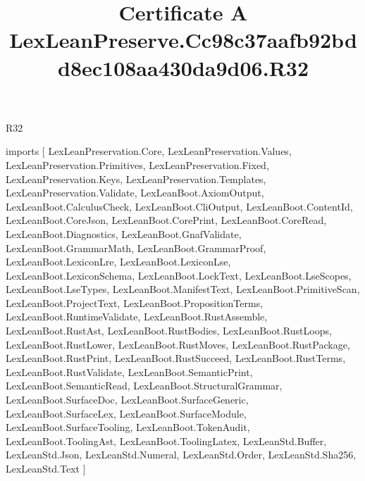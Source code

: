 \begin{lexlean}{R32}
\title{Certificate A LexLeanPreserve.Cc98c37aafb92bdd8ec108aa430da9d06.R32}
\begin{coremodule}
imports [
  LexLeanPreservation.Core,
  LexLeanPreservation.Values,
  LexLeanPreservation.Primitives,
  LexLeanPreservation.Fixed,
  LexLeanPreservation.Keys,
  LexLeanPreservation.Templates,
  LexLeanPreservation.Validate,
  LexLeanBoot.AxiomOutput,
  LexLeanBoot.CalculusCheck,
  LexLeanBoot.CliOutput,
  LexLeanBoot.ContentId,
  LexLeanBoot.CoreJson,
  LexLeanBoot.CorePrint,
  LexLeanBoot.CoreRead,
  LexLeanBoot.Diagnostics,
  LexLeanBoot.GnafValidate,
  LexLeanBoot.GrammarMath,
  LexLeanBoot.GrammarProof,
  LexLeanBoot.LexiconLre,
  LexLeanBoot.LexiconLse,
  LexLeanBoot.LexiconSchema,
  LexLeanBoot.LockText,
  LexLeanBoot.LseScopes,
  LexLeanBoot.LseTypes,
  LexLeanBoot.ManifestText,
  LexLeanBoot.PrimitiveScan,
  LexLeanBoot.ProjectText,
  LexLeanBoot.PropositionTerms,
  LexLeanBoot.RuntimeValidate,
  LexLeanBoot.RustAssemble,
  LexLeanBoot.RustAst,
  LexLeanBoot.RustBodies,
  LexLeanBoot.RustLoops,
  LexLeanBoot.RustLower,
  LexLeanBoot.RustMoves,
  LexLeanBoot.RustPackage,
  LexLeanBoot.RustPrint,
  LexLeanBoot.RustSucceed,
  LexLeanBoot.RustTerms,
  LexLeanBoot.RustValidate,
  LexLeanBoot.SemanticPrint,
  LexLeanBoot.SemanticRead,
  LexLeanBoot.StructuralGrammar,
  LexLeanBoot.SurfaceDoc,
  LexLeanBoot.SurfaceGeneric,
  LexLeanBoot.SurfaceLex,
  LexLeanBoot.SurfaceModule,
  LexLeanBoot.SurfaceTooling,
  LexLeanBoot.TokenAudit,
  LexLeanBoot.ToolingAst,
  LexLeanBoot.ToolingLatex,
  LexLeanStd.Buffer,
  LexLeanStd.Json,
  LexLeanStd.Numeral,
  LexLeanStd.Order,
  LexLeanStd.Sha256,
  LexLeanStd.Text
]


\end{coremodule}
\end{lexlean}
